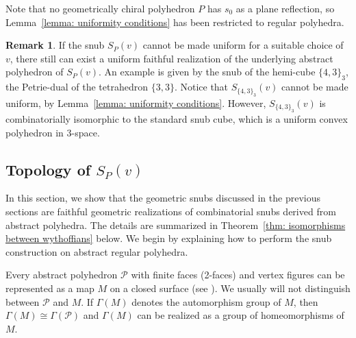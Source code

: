 \documentclass[12pt]{article}
\theoremstyle{definition}\newtheorem{definition}{Definition}[section]
\newtheorem{remark}{Remark}[]
\begin{document}
Note that no geometrically chiral polyhedron $P$ has $s_0$ as a plane reflection, so Lemma~\ref{lemma: uniformity conditions} has been restricted to regular polyhedra.  
\smallskip

\begin{remark} 
\label{hemicubesnub}
If the snub ${S}_P(v)$ cannot be made uniform for a suitable choice of $v$, there still can exist a uniform faithful realization of the underlying abstract polyhedron of ${S}_P(v)$. An example is given by the snub of the hemi-cube $\{4,3\}_3$, the Petrie-dual of the tetrahedron $\{3,3\}$. Notice that ${S}_{\{4,3\}_3}(v)$ cannot be made uniform, by Lemma~\ref{lemma: uniformity conditions}. However, ${S}_{\{4,3\}_3}(v)$ is combinatorially isomorphic to the standard snub cube, which is a uniform convex polyhedron in 3-space.   
\end{remark}
\smallskip

\subsection{Topology of ${S}_P(v)$} \label{section: topology}

In this section, we show that the geometric snubs discussed in the previous sections are faithful geometric realizations of combinatorial snubs derived from abstract polyhedra. The details are summarized in Theorem~\ref{thm: isomorphisms between wythoffians} below. We begin by explaining how to perform the snub construction on abstract regular polyhedra. \smallskip 

Every abstract polyhedron $\mathcal{P}$ with finite faces (2-faces) and vertex figures can be represented as a map $M$ on a closed surface (see \cite[Chs.~7B,\,7C]{41}). We usually will not distinguish between $\mathcal{P}$ and $M$. If $\Gamma(M)$ denotes the automorphism group of $M$, then $\Gamma(M)\cong\Gamma(\mathcal{P})$ and $\Gamma(M)$ can be realized as a group of homeomorphisms of $M$.
\end{document}
